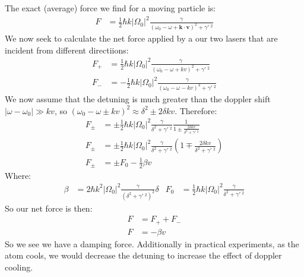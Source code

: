 The exact (average) force we find for a moving particle is:
\begin{align*}
	F &= \frac{1}{2}\hbar k |\Omega_0|^2 \frac{\gamma}{(\omega_0 - \omega + \bm{k}\cdot\bm{v})^2 + \gamma'\ ^2}
\end{align*}
We now seek to calculate the net force applied by a our two lasers that are incident from different directiions:
\begin{align*}
	F_+ &= \frac{1}{2}\hbar k |\Omega_0|^2 \frac{\gamma}{(\omega_0 - \omega + kv)^2 + \gamma'\ ^2} \\
	F_- &= -\frac{1}{2}\hbar k |\Omega_0|^2 \frac{\gamma}{(\omega_0 - \omega - kv)^2 + \gamma'\ ^2}
\end{align*}
We now assume that the detuning is much greater than the doppler shift $|\omega - \omega_0| \gg kv$, so $(\omega_0 - \omega \pm kv)^2 \approx \delta^2 \pm 2\delta kv$. Therefore:
\begin{align*}
	F_\pm &= \pm\frac{1}{2}\hbar k |\Omega_0|^2 \frac{\gamma}{\delta^2 + \gamma'\ ^2}\frac{1}{1\pm \frac{2\delta kv}{\delta^2 + \gamma'\ ^2}} \\
	F_\pm &= \pm\frac{1}{2}\hbar k |\Omega_0|^2 \frac{\gamma}{\delta^2 + \gamma'\ ^2}\left(1\mp \frac{2\delta kv}{\delta^2 + \gamma'\ ^2}\right) \\
	F_\pm &= \pm F_0 - \frac{1}{2}\beta v
\end{align*}
Where:
\begin{align*}
	\beta &= 2\hbar k^2|\Omega_0|^2 \frac{\gamma}{(\delta^2 + \gamma'\ ^2)^2} \delta &
	F_0 &= \frac{1}{2}\hbar k |\Omega_0|^2 \frac{\gamma}{\delta^2 + \gamma'\ ^2}
\end{align*}
So our net force is then:
\begin{align*}
	F &= F_+ + F_- \\
	F &= -\beta v
\end{align*}
So we see we have a damping force. Additionally in practical experiments, as the atom cools, we would decrease the detuning to increase the effect of doppler cooling.

